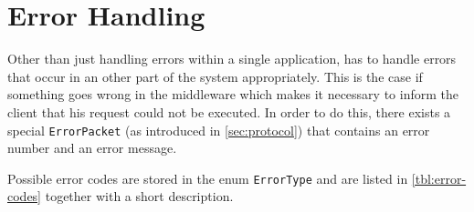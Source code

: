 \documentclass[a4paper, oneside]{csthesis}
\begin{document}
\section{Error Handling}
    Other than just handling errors within a single application, \telesto{} has
    to handle errors that occur in an other part of the system appropriately.
    This is the case if something goes wrong in the middleware which makes it
    necessary to inform the client that his request could not be executed. In
    order to do this, there exists a special {\tt ErrorPacket} (as introduced
    in \cref{sec:protocol}) that contains an error number and an error message.
    
    Possible error codes are stored in the enum {\tt ErrorType} and are listed
    in \cref{tbl:error-codes} together with a short description.
    
\end{document}
